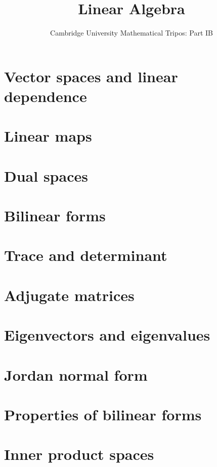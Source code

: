 \documentclass{article}
\title{Linear Algebra}
\author{Cambridge University Mathematical Tripos: Part IB}
\begin{document}
\maketitle

\tableofcontentsnewpage{}

\section{Vector spaces and linear dependence}

\section{Linear maps}

\section{Dual spaces}

\section{Bilinear forms}

\section{Trace and determinant}

\section{Adjugate matrices}

\section{Eigenvectors and eigenvalues}

\section{Jordan normal form}

\section{Properties of bilinear forms}

\section{Inner product spaces}

\end{document}

